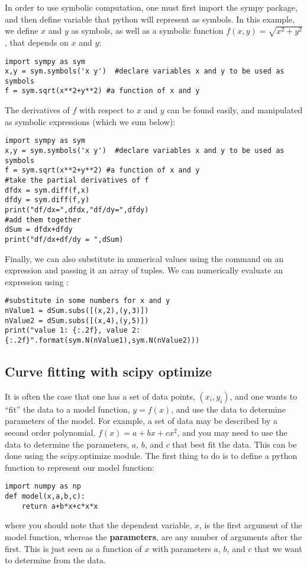 In order to use symbolic computation, one must first import the sympy package, and then define variable that python will represent as symbols. In this example, we define $x$ and $y$ as symbols, as well as a symbolic function $f(x,y)=\sqrt{x^2+y^2}$, that depends on $x$ and $y$:

\begin{lstlisting}[frame=single] 
import sympy as sym
x,y = sym.symbols('x y')  #declare variables x and y to be used as symbols
f = sym.sqrt(x**2+y**2) #a function of x and y
\end{lstlisting}

The derivatives of $f$ with respect to $x$ and $y$ can be found easily, and manipulated as symbolic expressions (which we sum below):
\begin{lstlisting}[frame=single] 
import sympy as sym
x,y = sym.symbols('x y')  #declare variables x and y to be used as symbols
f = sym.sqrt(x**2+y**2) #a function of x and y
#take the partial derivatives of f
dfdx = sym.diff(f,x)
dfdy = sym.diff(f,y)
print("df/dx=",dfdx,"df/dy=",dfdy)
#add them together
dSum = dfdx+dfdy
print("df/dx+df/dy = ",dSum)
\end{lstlisting}

Finally, we can also substitute in numerical values using the  command on an expression and passing it an array of tuples. We can numerically evaluate an expression using :
\begin{lstlisting}[frame=single] 
#substitute in some numbers for x and y
nValue1 = dSum.subs([(x,2),(y,3)])
nValue2 = dSum.subs([(x,4),(y,5)])
print("value 1: {:.2f}, value 2: {:.2f}".format(sym.N(nValue1),sym.N(nValue2)))
\end{lstlisting}

\subsection{Curve fitting with scipy optimize}

It is often the case that one has a set of data points, $(x_i,y_i)$, and one wants to ``fit'' the data to a model function, $y=f(x)$, and use the data to determine parameters of the model. For example, a set of data may be described by a second order polynomial, $f(x)=a+bx+cx^2$, and you may need to use the data to determine the parameters, $a$, $b$, and $c$ that best fit the data. This can be done using the scipy.optimize module. The first thing to do is to define a python function to represent our model function:
\begin{lstlisting}[frame=single] 
import numpy as np
def model(x,a,b,c):
    return a+b*x+c*x*x
\end{lstlisting}
where you should note that the dependent variable, $x$, is the first argument of the model function, whereas the \textbf{parameters}, are any number of arguments after the first. This is just seen as a function of $x$ with parameters $a$, $b$, and $c$ that we want to determine from the data. 

